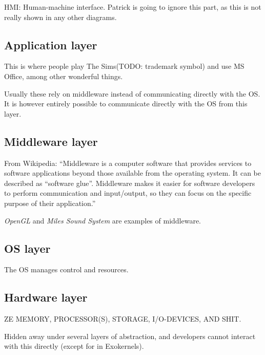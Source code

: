 \documentclass{article}
\begin{document}
HMI: Human-machine interface. Patrick is going to ignore this part, as this is not really shown in any other diagrams.

\subsection*{Application layer}
This is where people play The Sims(TODO: trademark symbol) and use MS Office, among other wonderful things.

Usually these rely on middleware instead of communicating directly with the OS. It is however entirely possible to communicate directly with the OS from this layer.

\subsection*{Middleware layer}
From Wikipedia: ``Middleware is a computer software that provides services to software applications beyond those available from the operating system. It can be described as ``software glue''. Middleware makes it easier for software developers to perform communication and input/output, so they can focus on the specific purpose of their application.''

\emph{OpenGL} and \emph{Miles Sound System} are examples of middleware.

\subsection*{OS layer}
The OS manages control and resources.

\subsection*{Hardware layer}
ZE MEMORY, PROCESSOR(S), STORAGE, I/O-DEVICES, AND SHIT.

Hidden away under several layers of abstraction, and developers cannot interact with this directly (except for in Exokernels).
\end{document}

